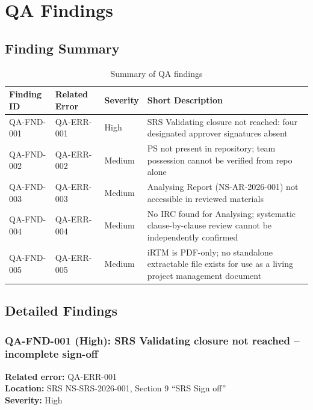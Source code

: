 \documentclass[11pt,a4paper]{article}
\begin{document}
\section{QA Findings}

\subsection{Finding Summary}

\begin{table}[H]
\centering
\small
\renewcommand{\arraystretch}{1.4}
\begin{tabularx}{\textwidth}{|p{}|p{}|p{}|X|}
\hline
\rowcolor{tableheader}
\textbf{Finding ID} & \textbf{Related Error} & \textbf{Severity} & \textbf{Short Description} \\
\hline
\rowcolor{highsev}
QA-FND-001 & QA-ERR-001 & High & SRS Validating closure not reached: four designated approver signatures absent \\
\hline
\rowcolor{medsev}
QA-FND-002 & QA-ERR-002 & Medium & PS not present in repository; team possession cannot be verified from repo alone \\
\hline
\rowcolor{medsev}
QA-FND-003 & QA-ERR-003 & Medium & Analysing Report (NS-AR-2026-001) not accessible in reviewed materials \\
\hline
\rowcolor{medsev}
QA-FND-004 & QA-ERR-004 & Medium & No IRC found for Analysing; systematic clause-by-clause review cannot be independently confirmed \\
\hline
\rowcolor{medsev}
QA-FND-005 & QA-ERR-005 & Medium & iRTM is PDF-only; no standalone extractable file exists for use as a living project management document \\
\hline
\end{tabularx}
\caption{Summary of QA findings}
\label{tab:qa-findings-summary}
\end{table}

\subsection{Detailed Findings}

\subsubsection*{QA-FND-001 (High): SRS Validating closure not reached -- incomplete sign-off}

\textbf{Related error:} QA-ERR-001 \\
\textbf{Location:} SRS NS-SRS-2026-001, Section 9 ``SRS Sign off'' \\
\textbf{Severity:} High
\end{document}
